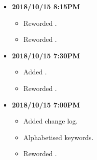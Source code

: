 \documentclass[../gazprea.tex]{subfiles}
\begin{document}
\begin{itemize}
\begin{itemize}
    \end{itemize}
  \item
    \textbf{2018/10/15 8:15PM}
    \begin{itemize}
      \item Reworded .
      \item Reworded .
    \end{itemize}
  \item
    \textbf{2018/10/15 7:30PM}
    \begin{itemize}
      \item Added .
      \item Reworded .
    \end{itemize}
  \item
    \textbf{2018/10/15 7:00PM}
    \begin{itemize}
      \item Added change log.
      \item Alphabetised keywords.
      \item Reworded .
    \end{itemize}
\end{itemize}
\end{document}
